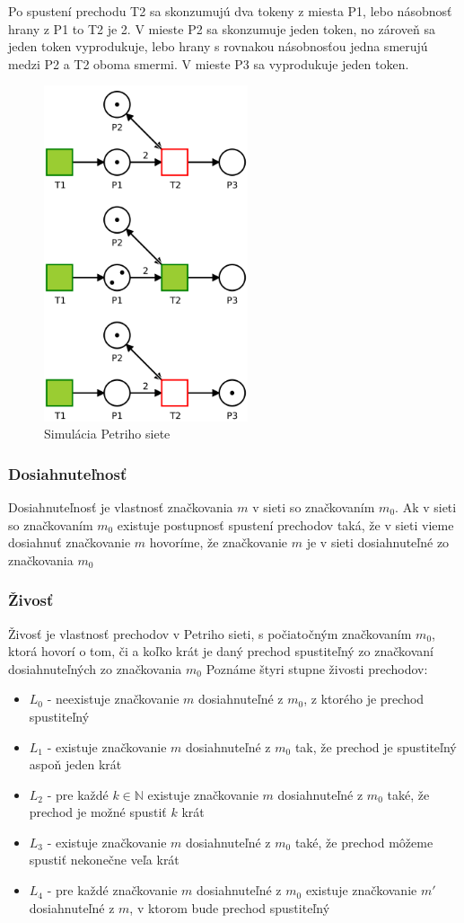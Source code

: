 Po spustení prechodu T2 sa skonzumujú dva tokeny z miesta P1, lebo násobnosť hrany  z P1 to T2 je 2. V mieste P2 sa skonzumuje jeden token, no zároveň sa jeden token vyprodukuje, lebo hrany s rovnakou násobnosťou jedna smerujú medzi P2 a T2 oboma smermi. V mieste P3 sa vyprodukuje jeden token.
\begin{figure}[!htbp]
\centering
\includegraphics[width=6cm]{img/pn_example_run.png}
\caption{Simulácia Petriho siete}
\label{pn_example_run}
\end{figure}

\subsubsection{Dosiahnuteľnosť}
Dosiahnuteľnosť je vlastnosť značkovania $m$ v sieti so značkovaním $m_0$. Ak v sieti so značkovaním $m_0$ existuje postupnosť spustení prechodov taká, že v sieti vieme dosiahnuť značkovanie $m$ hovoríme, že značkovanie $m$ je v sieti dosiahnuteľné zo značkovania $m_0$

\subsubsection{Živosť}
Živosť je vlastnosť prechodov v Petriho sieti, s počiatočným značkovaním $m_0$, ktorá hovorí o tom, či a koľko krát je daný prechod spustiteľný zo značkovaní dosiahnuteľných zo značkovania $m_0$  Poznáme štyri stupne živosti prechodov:
\begin{itemize}
\item $L_0$ - neexistuje značkovanie $m$ dosiahnuteľné z $m_0$, z ktorého je prechod spustiteľný
\item $L_1$ - existuje značkovanie $m$ dosiahnuteľné z $m_0$ tak, že prechod je spustiteľný aspoň jeden krát
\item $L_2$ - pre každé $k \in \mathbb N$  existuje značkovanie $m$ dosiahnuteľné z $m_0$ také, že prechod je možné spustiť $k$ krát
\item $L_3$ - existuje značkovanie $m$ dosiahnuteľné z $m_0$  také, že prechod môžeme spustiť nekonečne veľa krát
\item $L_4$ - pre každé značkovanie $m$  dosiahnuteľné z $m_0$ existuje značkovanie $m'$ dosiahnuteľné z $m$, v ktorom bude prechod spustiteľný
\end{itemize}

